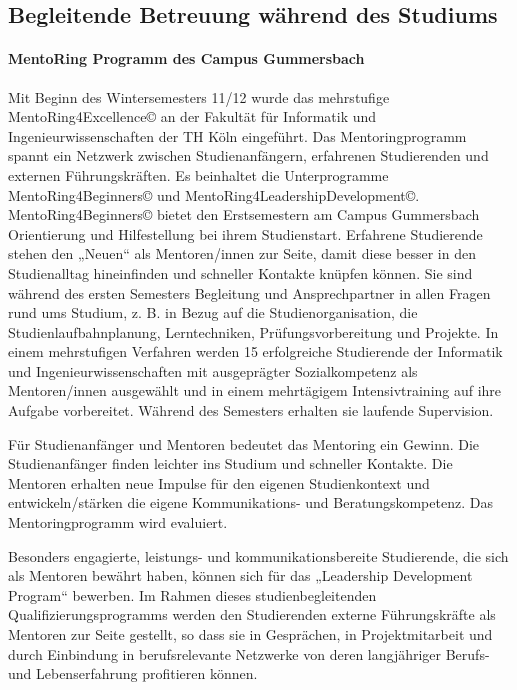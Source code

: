 \subsection{Begleitende Betreuung während des
Studiums}\label{begleitende-betreuung-wuxe4hrend-des-studiums}

\paragraph{MentoRing Programm des Campus
Gummersbach}\label{mentoring-programm-des-campus-gummersbach}

Mit Beginn des Wintersemesters 11/12 wurde das mehrstufige
MentoRing4Excellence© an der Fakultät für Informatik und
Ingenieurwissenschaften der TH Köln eingeführt. Das Mentoringprogramm
spannt ein Netzwerk zwischen Studienanfängern, erfahrenen Studierenden
und externen Führungskräften. Es beinhaltet die Unterprogramme
MentoRing4Beginners© und MentoRing4LeadershipDevelopment©.
MentoRing4Beginners© bietet den Erstsemestern am Campus Gummersbach
Orientierung und Hilfestellung bei ihrem Studienstart. Erfahrene
Studierende stehen den „Neuen`` als Mentoren/innen zur Seite, damit
diese besser in den Studienalltag hineinfinden und schneller Kontakte
knüpfen können. Sie sind während des ersten Semesters Begleitung und
Ansprechpartner in allen Fragen rund ums Studium, z. B. in Bezug auf die
Studienorganisation, die Studienlaufbahnplanung, Lerntechniken,
Prüfungsvorbereitung und Projekte. In einem mehrstufigen Verfahren
werden 15 erfolgreiche Studierende der Informatik und
Ingenieurwissenschaften mit ausgeprägter Sozialkompetenz als
Mentoren/innen ausgewählt und in einem mehrtägigem Intensivtraining auf
ihre Aufgabe vorbereitet. Während des Semesters erhalten sie laufende
Supervision.

Für Studienanfänger und Mentoren bedeutet das Mentoring ein Gewinn. Die
Studienanfänger finden leichter ins Studium und schneller Kontakte. Die
Mentoren erhalten neue Impulse für den eigenen Studienkontext und
entwickeln/stärken die eigene Kommunikations- und Beratungskompetenz.
Das Mentoringprogramm wird evaluiert.

Besonders engagierte, leistungs- und kommunikationsbereite Studierende,
die sich als Mentoren bewährt haben, können sich für das „Leadership
Development Program`` bewerben. Im Rahmen dieses studienbegleitenden
Qualifizierungsprogramms werden den Studierenden externe Führungskräfte
als Mentoren zur Seite gestellt, so dass sie in Gesprächen, in
Projektmitarbeit und durch Einbindung in berufsrelevante Netzwerke von
deren langjähriger Berufs- und Lebenserfahrung profitieren können.

